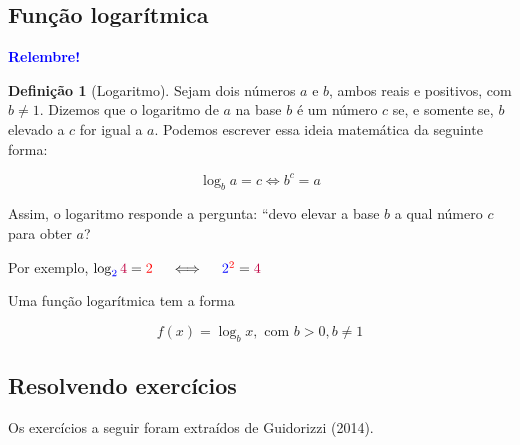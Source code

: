 \documentclass[12pt,openright,twoside,a4paper]{article}
\theoremstyle{definition}
\newtheorem{definition}{Definição}[section]
\begin{document}
	\subsection{Função logarítmica}
	
	\begin{snugshade}
		\textbf{\textcolor{blue}{Relembre!}}
		
		\begin{definition}[Logaritmo]
			Sejam dois números $a$ e $b$, ambos reais e positivos, com $b \neq 1$. Dizemos que o logaritmo de $a$ na base $b$ é um número $c$ se, e somente se, $b$ elevado a $c$ for igual a $a$.
			Podemos escrever essa ideia matemática da seguinte forma:
			
			\begin{equation*}
				\log_ba = c \iff b^c = a
			\end{equation*}        
		\end{definition}
		
		Assim, o logaritmo responde a pergunta: ``devo elevar a base $b$ a qual número $c$ para obter $a$?
		
		Por exemplo, $\log_{\textcolor{blue}{2}}\textcolor{purple}{4} = \textcolor{red}{2}
		\quad \iff \quad
		\textcolor{blue}{2}^{\textcolor{red}{2}} = \textcolor{purple}{4}$
	\end{snugshade}
	
	
	Uma função logarítmica tem a forma
	
	\begin{equation}
		f(x) = \log_bx, \text{ com } b > 0, b \neq 1
	\end{equation}
	
	\subsection{Resolvendo exercícios}
	Os exercícios a seguir foram extraídos de Guidorizzi (2014).
	
\end{document}
